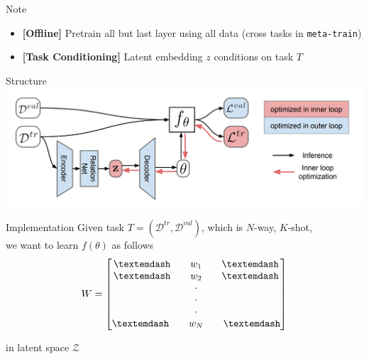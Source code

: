 \documentclass{beamer}
\begin{document}
\begin{frame}{Note}
  \begin{itemize}
    \item \textbf{[Offline]} Pretrain all but last layer using all data (cross tasks in \texttt{meta-train})
    \item \textbf{[Task Conditioning]} Latent embedding $z$ conditions on task $T$
  \end{itemize}
\end{frame}

\begin{frame}{Structure}
  \includegraphics[width=\textwidth]{fig/LEO-struct.png}
\end{frame}

\begin{frame}{Implementation}
  Given task $T = (\mathcal{D}^{tr}, \mathcal{D}^{val})$, which is $N$-way, $K$-shot,\\
  we want to learn $f(\theta)$ as follows
  \[
    W = \begin{bmatrix}
    \textemdash \quad \quad w_1 \quad \quad \textemdash  \\
    \textemdash \quad \quad w_2 \quad \quad \textemdash \\
    \cdot\\
    \cdot\\
    \cdot\\
    \textemdash \quad \quad w_N \quad \quad \textemdash\\
\end{bmatrix}
\]

\center in latent space $\mathcal{Z}$
\end{frame}
\end{document}
